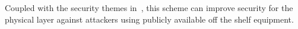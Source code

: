 \documentclass[letterpaper, 10 pt, conference]{ieeetran}  %
\theoremstyle{definition}
\theoremstyle{theorem}
\begin{document}
Coupled with the security themes in~\cite{Harrison2010}, this scheme can improve security for the physical layer against attackers using publicly available off the shelf equipment.








\end{document}
